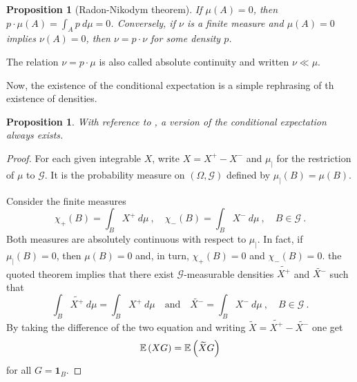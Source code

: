 \documentclass[12pt,a4paper]{amsart}
\newcommand{\one}{\bm 1}
\theoremstyle{plain}%
\newtheorem{proposition}[thm]{Proposition}
\theoremstyle{definition}
\theoremstyle{remark}
\begin{document}
\begin{proposition}[Radon-Nikodym theorem]
If $\mu(A) = 0$, then $p \cdot \mu(A) = \int_A p \ d\mu =
0$. Conversely, if $\nu$ is a finite measure and $\mu(A) = 0$ implies
$\nu(A) =0$, then $\nu = p \cdot \nu$ for some density $p$.  
\end{proposition}

The relation $\nu = p \cdot \mu$ is also called absolute continuity
and written $\nu \ll \mu$.

Now, the existence of the conditional expectation is a simple
rephrasing of th existence of densities.

\begin{proposition}
With reference to , a version of the conditional expectation always exists.  
\end{proposition}

\begin{proof}
For each given integrable
$X$, write $X=X^+-X^-$ and $\mu_|$ for the restriction of $\mu$ to
$\mathcal G$. It is the probability measure on $(\Omega, \mathcal
G)$  defined by $\mu_|(B) = \mu(B)$.

Consider the finite measures
\begin{equation*}
  \chi_+(B) = \int_B X^+ \ d\mu \ , \quad \chi_-(B) = \int_B X^- \
  d\mu \ , \quad B \in
  \mathcal G \ .  
\end{equation*}
Both measures are absolutely continuous with respect to $\mu_|$. In
fact, if $\mu_|(B) = 0$, then $\mu(B)=0$ and, in turn, $\chi_+(B) = 0$
and $\chi_-(B)=0$. the quoted theorem implies that there exist $\mathcal G$-measurable densities $\widetilde{X^+}$
and $\widetilde{X^-}$ such that
\begin{equation*}
  \int_B \widetilde{X^+} \ d\mu = \int_B X^+ \ d\mu \quad \text{and} \quad
  \widetilde{X^-} = \int_B X^- \ d\mu \ , \quad  B \in \mathcal G \ .  
\end{equation*}
By taking the difference of the two equation and writing
$\widetilde{X}=\widetilde{X^+}-\widetilde{X^-}$ one get
\begin{equation*}
  \operatorname{\mathbb E}\left(X G\right) = \operatorname{\mathbb E}\left(\widetilde X G\right)
\end{equation*}
for all $G = \one_B$.
\end{proof}


\end{document}
